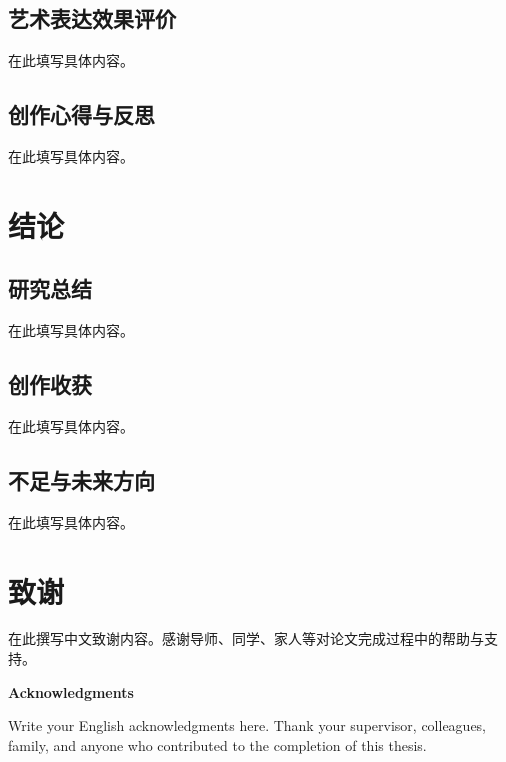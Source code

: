 \documentclass[a4paper,12pt,oneside]{ctexart}
\begin{document}
\subsection{艺术表达效果评价}
在此填写具体内容。

\subsection{创作心得与反思}
在此填写具体内容。


\section{结论}
\subsection{研究总结}
在此填写具体内容。

\subsection{创作收获}
在此填写具体内容。

\subsection{不足与未来方向}
在此填写具体内容。






\section*{致\quad 谢}

在此撰写中文致谢内容。感谢导师、同学、家人等对论文完成过程中的帮助与支持。

\vspace{1cm}
\begin{center}
{\large \textbf{Acknowledgments}}
\end{center}
\vspace{0.3cm}

Write your English acknowledgments here. Thank your supervisor, colleagues, family, and anyone who contributed to the completion of this thesis.
\end{document}
